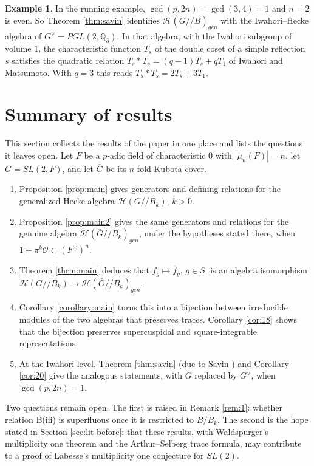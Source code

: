 \documentclass[12pt,letterpaper,reqno]{amsart}
\let\cal\mathcal
\theoremstyle{definition}
\newtheorem{example}[theorem]{Example}
\theoremstyle{remark}
\numberwithin{equation}{section}
\begin{document}
\begin{example}
\label{ex:savin}
In the running example, $\gcd(p,2n)=\gcd(3,4)=1$ and $n=2$ is even. So
Theorem \ref{thm:savin} identifies ${\cal H}(\overline{G}//B)_{gen}$ with the
Iwahori--Hecke algebra of $G^\vee=PGL(2,\mathbb{Q}_3)$. In that algebra, with
the Iwahori subgroup of volume $1$, the characteristic function $T_s$ of the
double coset of a simple reflection $s$ satisfies the quadratic relation
$T_s*T_s=(q-1)T_s+qT_1$ of Iwahori and Matsumoto. With $q=3$ this reads
$T_s*T_s=2T_s+3T_1$.
\end{example}

\section{Summary of results}
\label{sec:summary}

This section collects the results of the paper in one place and lists the
questions it leaves open. Let $F$ be a $p$-adic field of characteristic $0$
with $|\mu_n(F)|=n$, let $G=SL(2,F)$, and let $\overline{G}$ be its $n$-fold
Kubota cover.
\begin{enumerate}
\item Proposition \ref{prop:main} gives generators and defining relations for
the generalized Hecke algebra ${\cal H}(G//B_k)$, $k>0$.
\item Proposition \ref{prop:main2} gives the same generators and relations for
the genuine algebra ${\cal H}(\overline{G}//B_k)_{gen}$, under the hypotheses
stated there, when $1+\pi^k{\cal O}\subset(F^\times)^n$.
\item Theorem \ref{thrm:main} deduces that $f_g\mapsto\overline{f}_g$,
$g\in S$, is an algebra isomorphism ${\cal H}(G//B_k)\rightarrow
{\cal H}(\overline{G}//B_k)_{gen}$.
\item Corollary \ref{corollary:main} turns this into a bijection between
irreducible modules of the two algebras that preserves traces. Corollary
\ref{cor:18} shows that the bijection preserves supercuspidal and
square-integrable representations.
\item At the Iwahori level, Theorem \ref{thm:savin} (due to Savin
\cite{Sa88}) and Corollary \ref{cor:20} give the analogous statements, with
$G$ replaced by $G^\vee$, when $\gcd(p,2n)=1$.
\end{enumerate}

Two questions remain open. The first is raised in Remark \ref{rem:1}: whether
relation B(iii) is superfluous once it is restricted to $B/B_k$. The second is
the hope stated in Section \ref{sec:lit-before}: that these results, with
Waldspurger's multiplicity one theorem \cite{Wa80} and the Arthur--Selberg
trace formula, may contribute to a proof of Labesse's multiplicity one
conjecture for $SL(2)$.
\end{document}
